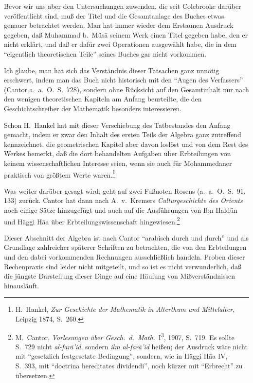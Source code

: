 \documentclass[11pt,a4paper]{article}
\newcommand{\alf}{\=a}
\newcommand{\enquote}[1]{``#1''}
\begin{document}
Bevor wir uns aber den Untersuchungen zuwenden, die seit Colebrooke dar\"uber ver\"offentlicht sind, mu\ss{} der Titel und die Gesamtanlage des Buches etwas genauer betrachtet werden. Man hat immer wieder dem Erstaunen Ausdruck gegeben, da\ss{} Muhammad b.\ M\"us\=a seinem Werk einen Titel gegeben habe, den er nicht erkl\"art, und da\ss{} er daf\"ur zwei Operationen ausgew\"ahlt habe, die in dem \enquote{eigentlich theoretischen Teile} seines Buches gar nicht vorkommen.

Ich glaube, man hat sich das Verst\"andnis dieser Tatsachen ganz unn\"otig erschwert, indem man das Buch nicht historisch mit den \enquote{Augen des Verfassers} (Cantor a.\ a.\ O.\ S.\ 728), sondern ohne R\"ucksicht auf den Gesamtinhalt nur nach den wenigen theoretischen Kapiteln am Anfang beurteilte, die den Geschichtschreiber der Mathematik besonders interessieren.

Schon H.\ Hankel hat mit dieser Verschiebung des Tatbestandes den Anfang gemacht, indem er zwar den Inhalt des ersten Teils der Algebra ganz zutreffend kennzeichnet, die geometrischen Kapitel aber davon losl\"ost und von dem Rest des Werkes bemerkt, da\ss{} die dort behandelten Aufgaben \"uber Erbteilungen von keinem wissenschaftlichen Interesse seien, wenn sie auch f\"ur Mohammedaner praktisch von gr\"o\ss{}tem Werte waren.\footnote{H.\ Hankel, \textit{Zur Geschichte der Mathematik in Alterthum und Mittelalter}, Leipzig 1874, S.\ 260.}

Was weiter dar\"uber gesagt wird, geht auf zwei Fu\ss{}noten Rosens (a.\ a.\ O.\ S.\ 91, 133) zur\"uck. Cantor hat dann nach A.\ v.\ Kremers \textit{Culturgeschichte des Orients} noch einige S\"atze hinzugef\"ugt und auch auf die Ausf\"uhrungen von Ibn Hald\"un und H\"aggi H\alf{a} \"uber Erbteilungswissenschaft hingewiesen.\footnote{M.\ Cantor, \textit{Vorlesungen \"uber Gesch.\ d.\ Math.}\ I\textsuperscript{3}, 1907, S.\ 719. Es sollte S.\ 729 nicht \textit{al-far\=a'id}, sondern \textit{ilm al-far\=a'id} hei\ss{}en; der Ausdruck w\"are nicht mit \enquote{gesetzlich festgesetzte Bedingung}, sondern, wie in H\"aggi H\alf{a} IV, S.\ 393, mit \enquote{doctrina hereditates dividendi}, noch k\"urzer mit \enquote{Erbrecht} zu \"ubersetzen.}

Dieser Abschnitt der Algebra ist nach Cantor \enquote{arabisch durch und durch} und als Grundlage zahlreicher sp\"aterer Schriften zu betrachten, die von den Erbteilungen und den dabei vorkommenden Rechnungen ausschlie\ss{}lich handeln. Proben dieser Rechenpraxis sind leider nicht mitgeteilt, und so ist es nicht verwunderlich, da\ss{} die j\"ungste Darstellung dieser Dinge auf eine H\"aufung von Mi\ss{}verst\"andnissen hinausl\"auft.
\end{document}
